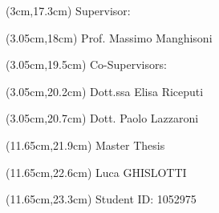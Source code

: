 \begin{textblock*}{\textwidth}(3cm,17.3cm) 
    Supervisor:
\end{textblock*}
\begin{textblock*}{\textwidth}(3.05cm,18cm)
    Prof. Massimo Manghisoni
\end{textblock*}

\begin{textblock*}{\textwidth}(3.05cm,19.5cm)
    Co-Supervisors:
\end{textblock*}
\begin{textblock*}{\textwidth}(3.05cm,20.2cm)
    Dott.ssa Elisa Riceputi
\end{textblock*}
\begin{textblock*}{\textwidth}(3.05cm,20.7cm) 
    Dott. Paolo Lazzaroni
\end{textblock*}

\begin{textblock*}{\textwidth}(11.65cm,21.9cm)
    Master Thesis
\end{textblock*}
\begin{textblock*}{\textwidth}(11.65cm,22.6cm)
    Luca GHISLOTTI
\end{textblock*}
\begin{textblock*}{\textwidth}(11.65cm,23.3cm) 
    Student ID: 1052975
\end{textblock*}